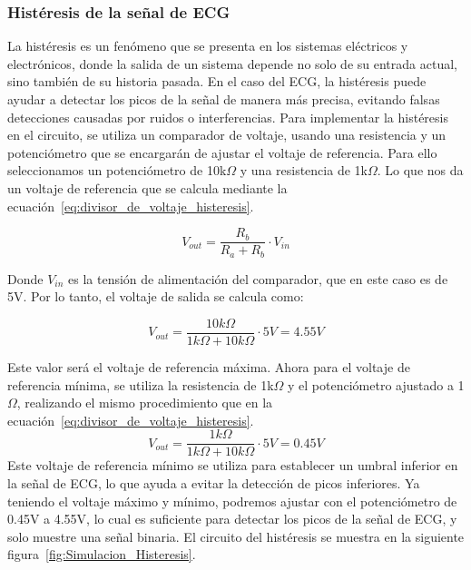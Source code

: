         \subsubsection{Histéresis de la señal de ECG}
        La histéresis es un fenómeno que se presenta en los sistemas eléctricos y electrónicos, donde la salida de un sistema depende no solo de su entrada actual, sino también de su historia pasada. En el caso del ECG, la histéresis puede ayudar a detectar los picos de la señal de manera más precisa, evitando falsas detecciones causadas por ruidos o interferencias. Para implementar la histéresis en el circuito, se utiliza un comparador de voltaje, usando una resistencia y un potenciómetro que se encargarán de ajustar el voltaje de referencia. Para ello seleccionamos un potenciómetro de 10k$\Omega$ y una resistencia de 1k$\Omega$. Lo que nos da un voltaje de referencia que se calcula mediante la ecuación~\ref{eq:divisor_de_voltaje_histeresis}.

        \begin{equation}
            \label{eq:divisor_de_voltaje_histeresis}
            V_{out} = \frac{R_b}{R_a + R_b} \cdot V_{in}
        \end{equation}

        Donde $V_{in}$ es la tensión de alimentación del comparador, que en este caso es de 5V. Por lo tanto, el voltaje de salida se calcula como:
        
        \begin{equation}
            \label{eq:voltaje_divisor_histeresis}
            V_{out} = \frac{10k\Omega}{1k\Omega + 10k\Omega} \cdot 5V = 4.55V
        \end{equation}

        Este valor será el voltaje de referencia máxima.
        Ahora para el voltaje de referencia mínima, se utiliza la resistencia de 1k$\Omega$ y el potenciómetro ajustado a 1$\Omega$, realizando el mismo procedimiento que en la ecuación~\ref{eq:divisor_de_voltaje_histeresis}.
        \begin{equation}
            \label{eq:voltaje_divisor_histeresis_minimo}
            V_{out} = \frac{1k\Omega}{1k\Omega + 10k\Omega} \cdot 5V = 0.45V
        \end{equation}
        Este voltaje de referencia mínimo se utiliza para establecer un umbral inferior en la señal de ECG, lo que ayuda a evitar la detección de picos inferiores.
        Ya teniendo el voltaje máximo y mínimo, podremos ajustar con el potenciómetro de 0.45V a 4.55V, lo cual es suficiente para detectar los picos de la señal de ECG, y solo muestre una señal binaria.
        El circuito del histéresis se muestra en la siguiente figura~\ref{fig:Simulacion_Histeresis}.

